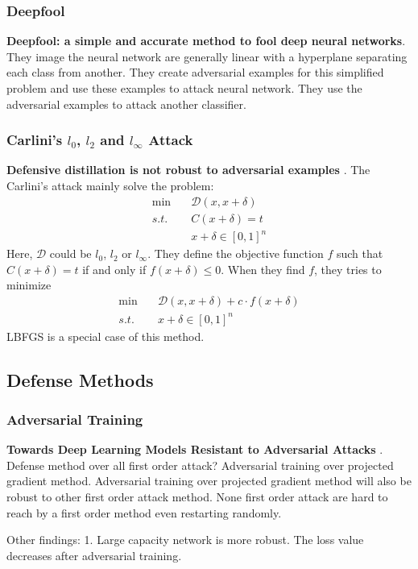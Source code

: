 \documentclass[10pt,a4paper]{article}
\begin{document}
\subsubsection{Deepfool}
\textbf{Deepfool: a simple and accurate method to fool deep neural networks}\cite{madry2017towards}.
They image the neural network are generally linear with a hyperplane separating each class from another. They create adversarial examples for this simplified problem and use these examples to attack neural network. They use the adversarial examples to attack another classifier.
\subsubsection{Carlini's $l_0$, $l_2$ and $l_{\infty}$ Attack}
\textbf{Defensive distillation is not robust to adversarial examples} \cite{carlini2016towards}. The Carlini's attack mainly solve the problem:
\begin{align*}
\min &\quad \mathcal{D}(x,x+\delta)\\
s.t. &\quad C(x+\delta) = t \\
& \quad x+\delta \in [0,1]^n	
\end{align*}
Here, $\mathcal{D}$ could be $l_0$, $l_2$ or $l_{\infty}$. They define the objective function $f$ such that $C(x+\delta)=t$ if and only if $f(x+\delta) \leq 0$. When they find $f$, they tries to minimize 
\begin{align*}
\min & \quad \mathcal{D}(x,x+\delta) +c\cdot f(x+\delta)\\
s.t. & \quad x+\delta \in [0,1]^n	
\end{align*}
LBFGS is a special case of this method.

\subsection{Defense Methods}
\subsubsection{Adversarial Training}
\textbf{Towards Deep Learning Models Resistant to Adversarial Attacks} \cite{madry2017towards}.
Defense method over all first order attack? Adversarial training over projected gradient method. Adversarial training over projected gradient method will also be robust to other first order attack method. None first order attack are hard to reach by a first order method even restarting randomly.

Other findings: 1. Large capacity network is more robust. The loss value decreases after adversarial training.
\end{document}

